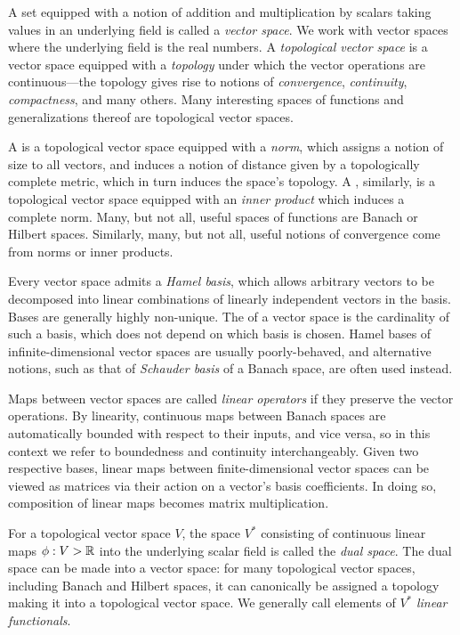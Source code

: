 \documentclass[11pt]{book}
\begin{document}
A set equipped with a notion of addition and multiplication by scalars taking values in an underlying field is called a \emph{vector space}.
We work with vector spaces where the underlying field is the real numbers.
A \emph{topological vector space} is a vector space equipped with a \emph{topology} under which the vector operations are continuous---the topology gives rise to notions of \emph{convergence}, \emph{continuity}, \emph{compactness}, and many others.
Many interesting spaces of functions and generalizations thereof are topological vector spaces.

A  is a topological vector space equipped with a \emph{norm}, which assigns a notion of size to all vectors, and induces a notion of distance given by a topologically complete metric, which in turn induces the space's topology.
A , similarly, is a topological vector space equipped with an \emph{inner product} which induces a complete norm.
Many, but not all, useful spaces of functions are Banach or Hilbert spaces.
Similarly, many, but not all, useful notions of convergence come from norms or inner products.

Every vector space admits a \emph{Hamel basis}, which allows arbitrary vectors to be decomposed into linear combinations of linearly independent vectors in the basis.
Bases are generally highly non-unique.
The  of a vector space is the cardinality of such a basis, which does not depend on which basis is chosen.
Hamel bases of infinite-dimensional vector spaces are usually poorly-behaved, and alternative notions, such as that of \emph{Schauder basis} of a Banach space, are often used instead.

Maps between vector spaces are called \emph{linear operators} if they preserve the vector operations.
By linearity, continuous maps between Banach spaces are automatically bounded with respect to their inputs, and vice versa, so in this context we refer to boundedness and continuity interchangeably.
Given two respective bases, linear maps between finite-dimensional vector spaces can be viewed as matrices via their action on a vector's basis coefficients.
In doing so, composition of linear maps becomes matrix multiplication.

For a topological vector space $V$, the space $V^*$ consisting of continuous linear maps $\phi : V \-> \mathbb{R}$ into the underlying scalar field is called the \emph{dual space}.
The dual space can be made into a vector space: for many topological vector spaces, including Banach and Hilbert spaces, it can canonically be assigned a topology making it into a topological vector space.
We generally call elements of $V^*$ \emph{linear functionals}.
\end{document}
